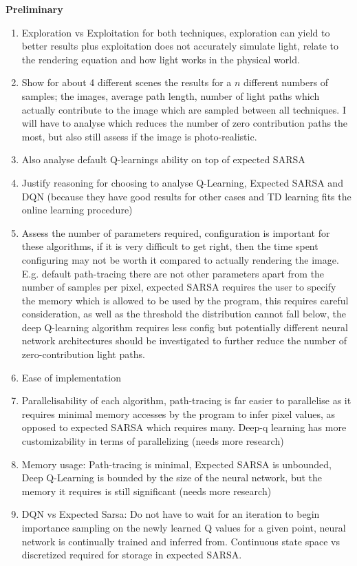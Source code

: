 \documentclass[ %
                    author={Callum Pearce},
                supervisor={Dr. Neill Campbell},
                    degree={MEng},
                     title={How effective are Temporal difference learning methods for reducing the number of zero contribution light paths, while still accurately approximating Global Illumination in Path tracing?},
                  subtitle={},
                      type={research},
                      year={2019} ]{dissertation}
\begin{document}
\textbf{Preliminary}
\begin{enumerate}
\item Exploration vs Exploitation for both techniques, exploration can yield to better results plus exploitation does not accurately simulate light, relate to the rendering equation and how light works in the physical world.

\item Show for about 4 different scenes the results for a $n$ different numbers of samples; the images, average path length, number of light paths which actually contribute to the image which are sampled between all techniques. I will have to analyse which reduces the number of zero contribution paths the most, but also still assess if the image is photo-realistic.

\item Also analyse default Q-learnings ability on top of expected SARSA

\item Justify reasoning for choosing to analyse Q-Learning, Expected SARSA and DQN (because they have good results for other cases and TD learning fits the online learning procedure)

\item Assess the number of parameters required, configuration is important for these algorithms, if it is very difficult to get right, then the time spent configuring may not be worth it compared to actually rendering the image. E.g. default path-tracing there are not other parameters apart from the number of samples per pixel, expected SARSA requires the user to specify the memory which is allowed to be used by the program, this requires careful consideration, as well as the threshold the distribution cannot fall below, the deep Q-learning algorithm requires less config but potentially different neural network architectures should be investigated to further reduce the number of zero-contribution light paths. 

\item Ease of implementation 

\item Parallelisability of each algorithm, path-tracing is far easier to parallelise as it requires minimal memory accesses by the program to infer pixel values, as opposed to expected SARSA which requires many. Deep-q learning has more customizability in terms of parallelizing (needs more research)

\item Memory usage: Path-tracing is minimal, Expected SARSA is unbounded, Deep Q-Learning is bounded by the size of the neural network, but the memory it requires is still significant (needs more research)

\item DQN vs Expected Sarsa: Do not have to wait for an iteration to begin
 importance sampling on the newly learned Q values for a given point, 
 neural network is continually trained and inferred from. Continuous state 
 space vs discretized required for storage in expected SARSA.
\end{enumerate}
\end{document}

